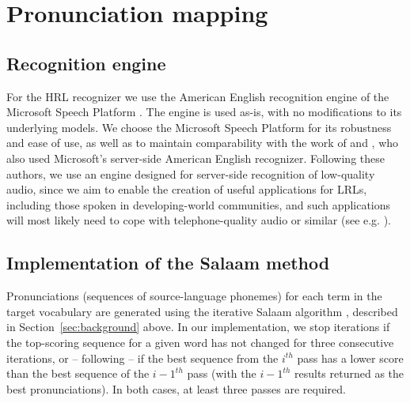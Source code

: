 \documentclass[11pt]{article}
\begin{document}


\section{Pronunciation mapping}
\label{sec:backend}

\subsection{Recognition engine}
\label{sec:engine}
For the HRL recognizer
we use the American English recognition engine 
of the Microsoft Speech Platform \cite{mspsdk}. 
The engine is used as-is, with no modifications to its underlying models. 
We choose the Microsoft Speech Platform for its robustness and ease of use, as well as to maintain comparability with the work of  and , who also used Microsoft's server-side American English recognizer. 
Following these authors, we use an engine designed for server-side recognition of low-quality audio, since we aim to enable the creation of useful applications for LRLs, including those spoken in developing-world communities, and such applications will most likely need to cope with telephone-quality audio or similar (see e.g. ).



\subsection{Implementation of the Salaam method}
\label{sec:implementation}

Pronunciations (sequences of source-language phonemes) for each term in the target vocabulary are generated using the iterative Salaam algorithm \cite[Sec.~4.1]{Qiao10}, described in Section~\ref{sec:background} above. In our implementation, 
we stop iterations
if the top-scoring sequence for a given word has not changed for three consecutive iterations, or -- following  --  if the best sequence from the $i^{th}$ pass has a lower score than the best sequence of the ${i - 1}^{th}$ pass (with the ${i - 1}^{th}$ results returned as the best pronunciations). In both cases, at least three passes are required. 
\end{document}
